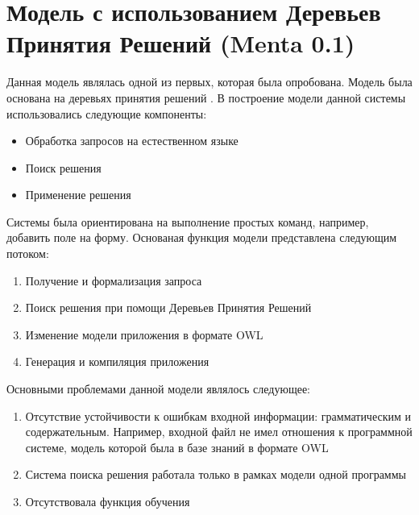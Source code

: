 \section{Модель с использованием Деревьев Принятия Решений (Menta 0.1)}
Данная модель являлась одной из первых, которая была опробована. Модель была основана на деревьях принятия решений \cite{DTREE}. В построение модели данной системы использовались следующие компоненты:
\begin{itemize}
	\item Обработка запросов на естественном языке
	\item Поиск решения
	\item Применение решения
\end{itemize}
Системы была ориентирована на выполнение простых команд, например, добавить поле на форму. Основаная функция модели представлена следующим потоком:
\begin{enumerate}
	\item Получение и формализация запроса
	\item Поиск решения при помощи Деревьев Принятия Решений
	\item Изменение модели приложения в формате OWL \cite{OWL}
	\item Генерация и компиляция приложения
\end{enumerate}
Основными проблемами данной модели являлось следующее:
\begin{enumerate}
	\item Отсутствие устойчивости к ошибкам входной информации: грамматическим и содержательным. Например, входной файл не имел отношения к программной системе, модель которой была в базе знаний в формате OWL
	\item Система поиска решения работала только в рамках модели одной программы
	\item Отсутствовала функция обучения 
\end{enumerate}



